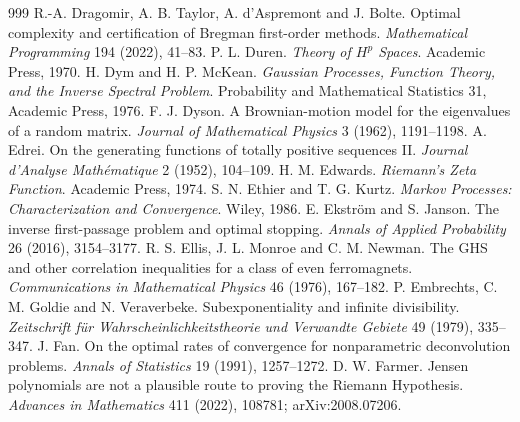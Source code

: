\begin{thebibliography}{999}
 R.-A. Dragomir, A. B. Taylor, A. d'Aspremont and J. Bolte. Optimal complexity and certification of Bregman first-order methods. \emph{Mathematical Programming} 194 (2022), 41--83.
 P. L. Duren. \emph{Theory of $H^p$ Spaces}. Academic Press, 1970.
 H. Dym and H. P. McKean. \emph{Gaussian Processes, Function Theory, and the Inverse Spectral Problem}. Probability and Mathematical Statistics 31, Academic Press, 1976.
 F. J. Dyson. A Brownian-motion model for the eigenvalues of a random matrix. \emph{Journal of Mathematical Physics} 3 (1962), 1191--1198.
 A. Edrei. On the generating functions of totally positive sequences II. \emph{Journal d'Analyse Math\'ematique} 2 (1952), 104--109.
 H. M. Edwards. \emph{Riemann's Zeta Function}. Academic Press, 1974.
 S. N. Ethier and T. G. Kurtz. \emph{Markov Processes: Characterization and Convergence}. Wiley, 1986.
 E. Ekstr\"om and S. Janson. The inverse first-passage problem and optimal stopping. \emph{Annals of Applied Probability} 26 (2016), 3154--3177.
 R. S. Ellis, J. L. Monroe and C. M. Newman. The GHS and other correlation inequalities for a class of even ferromagnets. \emph{Communications in Mathematical Physics} 46 (1976), 167--182.
 P. Embrechts, C. M. Goldie and N. Veraverbeke. Subexponentiality and infinite divisibility. \emph{Zeitschrift f\"ur Wahrscheinlichkeitstheorie und Verwandte Gebiete} 49 (1979), 335--347.
 J. Fan. On the optimal rates of convergence for nonparametric deconvolution problems. \emph{Annals of Statistics} 19 (1991), 1257--1272.
 D. W. Farmer. Jensen polynomials are not a plausible route to proving the Riemann Hypothesis. \emph{Advances in Mathematics} 411 (2022), 108781; arXiv:2008.07206.

\end{thebibliography}
